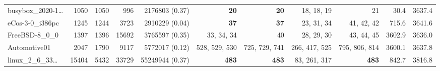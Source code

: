 \begin{table*}
\begin{tiny}
{\begin{tabular}{lrrrrrrrrrr}
busybox\_2020-1\ldots & \num[text-series-to-math=true]{1050} & \num[text-series-to-math=true]{1050} & \num[text-series-to-math=true]{996} & \num[text-series-to-math=true]{2176803} (\num[text-series-to-math=true]{0.37}) & \textbf{\num[text-series-to-math=true]{20}} & \textbf{\num[text-series-to-math=true]{20}} & \num[text-series-to-math=true]{18}, \num[text-series-to-math=true]{18}, \num[text-series-to-math=true]{19} & \num[text-series-to-math=true]{21} & 30.4 & 3637.4\\
eCos-3-0\_i386pc & \num[text-series-to-math=true]{1245} & \num[text-series-to-math=true]{1244} & \num[text-series-to-math=true]{3723} & \num[text-series-to-math=true]{2910229} (\num[text-series-to-math=true]{0.04}) & \textbf{\num[text-series-to-math=true]{37}} & \textbf{\num[text-series-to-math=true]{37}} & \num[text-series-to-math=true]{23}, \num[text-series-to-math=true]{31}, \num[text-series-to-math=true]{34} & \num[text-series-to-math=true]{41}, \num[text-series-to-math=true]{42}, \num[text-series-to-math=true]{42} & 715.6 & 3641.6\\
FreeBSD-8\_0\_0 & \num[text-series-to-math=true]{1397} & \num[text-series-to-math=true]{1396} & \num[text-series-to-math=true]{15692} & \num[text-series-to-math=true]{3765597} (\num[text-series-to-math=true]{0.35}) & \num[text-series-to-math=true]{33}, \num[text-series-to-math=true]{34}, \num[text-series-to-math=true]{34} & \num[text-series-to-math=true]{40} & \num[text-series-to-math=true]{28}, \num[text-series-to-math=true]{29}, \num[text-series-to-math=true]{30} & \num[text-series-to-math=true]{43}, \num[text-series-to-math=true]{44}, \num[text-series-to-math=true]{45} & 3602.9 & 3636.0\\
Automotive01 & \num[text-series-to-math=true]{2047} & \num[text-series-to-math=true]{1790} & \num[text-series-to-math=true]{9117} & \num[text-series-to-math=true]{5772017} (\num[text-series-to-math=true]{0.12}) & \num[text-series-to-math=true]{528}, \num[text-series-to-math=true]{529}, \num[text-series-to-math=true]{530} & \num[text-series-to-math=true]{725}, \num[text-series-to-math=true]{729}, \num[text-series-to-math=true]{741} & \num[text-series-to-math=true]{266}, \num[text-series-to-math=true]{417}, \num[text-series-to-math=true]{525} & \num[text-series-to-math=true]{795}, \num[text-series-to-math=true]{806}, \num[text-series-to-math=true]{814} & 3600.1 & 3637.8\\
linux\_2\_6\_33\ldots & \num[text-series-to-math=true]{15404} & \num[text-series-to-math=true]{5432} & \num[text-series-to-math=true]{33729} & \num[text-series-to-math=true]{55249944} (\num[text-series-to-math=true]{0.37}) & \textbf{\num[text-series-to-math=true]{483}} & \textbf{\num[text-series-to-math=true]{483}} & \num[text-series-to-math=true]{83}, \num[text-series-to-math=true]{261}, \num[text-series-to-math=true]{317} & \textbf{\num[text-series-to-math=true]{483}} & 842.7 & 3816.8\\

\end{tabular}}
\end{tiny}
\end{table*}
